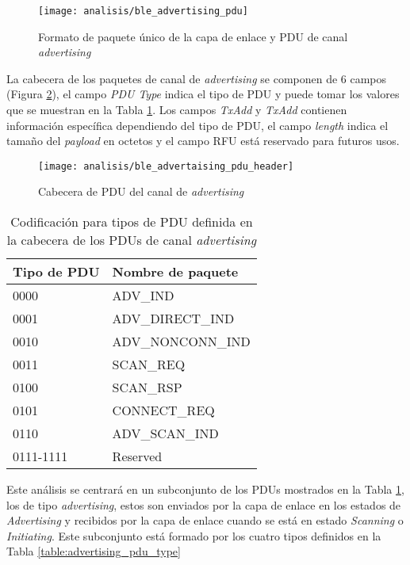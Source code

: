 \documentclass[../proyecto.tex]{subfiles}
\begin{document}
\begin{figure}[H]
\centering
\texttt{[image: analisis/ble\_advertising\_pdu]}
\caption{Formato de paquete único de la capa de enlace y PDU de canal \textit{advertising}}
\label{fig:ble_advertising_pdu}
\end{figure}

La cabecera de los paquetes de canal de \textit{advertising} se componen de 6 campos (Figura \ref{fig:ble_advertaising_pdu_header}), el campo \textit{PDU Type} indica el tipo de PDU y puede tomar los valores que se muestran en la Tabla \ref{table:advertising_channel_pdu_type}. Los campos \textit{TxAdd} y \textit{TxAdd} contienen información específica dependiendo del tipo de PDU, el campo \textit{length} indica el tamaño del \textit{payload} en octetos y el campo RFU está reservado para futuros usos.\\

\begin{figure}[H]
\centering
\texttt{[image: analisis/ble\_advertaising\_pdu\_header]}
\caption{Cabecera de PDU del canal de \textit{advertising}}
\label{fig:ble_advertaising_pdu_header}
\end{figure}


\begin{table}[h!]
\centering
\begin{tabular}{ |l|m{12em}| }
\hline
\textbf{Tipo de PDU} & \textbf{Nombre de paquete} \\
\hline\hline
0000  & ADV\_IND  \\ \hline
0001  & ADV\_DIRECT\_IND  \\ \hline
0010  & ADV\_NONCONN\_IND \\ \hline
0011 & SCAN\_REQ \\ \hline
0100 & SCAN\_RSP \\ \hline
0101 & CONNECT\_REQ \\ \hline
0110 & ADV\_SCAN\_IND \\ \hline
0111-1111 & Reserved \\ \hline
\end{tabular}
\caption{Codificación para tipos de PDU definida en la cabecera de los PDUs de canal \textit{advertising}}
\label{table:advertising_channel_pdu_type}
\end{table}

Este análisis se centrará en un subconjunto de los PDUs mostrados en la Tabla \ref{table:advertising_channel_pdu_type}, los de tipo \textit{advertising}, estos son enviados por la capa de enlace en los estados de \textit{Advertising} y recibidos por la capa de enlace cuando se está en estado \textit{Scanning} o \textit{Initiating}. Este subconjunto está formado por los cuatro tipos definidos en la Tabla \ref{table:advertising_pdu_type}\\
\end{document}
